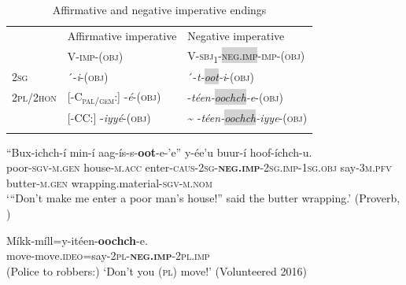 \documentclass[output=paper,colorlinks,citecolor=brown,draftmode
]{langscibook}
\begin{document}
\begin{table}
\caption{Affirmative and negative imperative endings}
\label{tab:treis:4}
 \begin{tabularx}{\textwidth}{lXl}
  \lsptoprule
& Affirmative imperative & Negative imperative \\
& V-\textsc{imp}-(\textsc{obj}) & V-\textsc{sbj\textsubscript{1}}-\textsc{\colorbox{lightgray}{neg.imp}}-\textsc{imp}-(\textsc{obj})\\ 
    \midrule 
\textsc{2sg} & ´-\textit{i}-(\textsc{obj}) & ´-\textit{t-\colorbox{lightgray}{oot}-i}-(\textsc{obj})\\
\textsc{2pl/2hon} & [-C\textsubscript{\textsc{pal/gem}}:] -\textit{é}-(\textsc{obj}) &  -\textit{téen-\colorbox{lightgray}{oochch}-e}-(\textsc{obj})\\
& [-CC:] -\textit{iyyé}-(\textsc{obj}) & \~{} -\textit{téen-\colorbox{lightgray}{oochch}-iyye}-(\textsc{obj})\\
  \lspbottomrule
 \end{tabularx}
\end{table}


\ea\label{ex:treis:5} 
\gll “Bux-ichch-í 	   min-í 				  aag-ís-s-\textbf{oot}-e-’e” y-ée’u 			buur-í 			hoof-íchch-u.\\
{\db}poor-\textsc{sgv-m.gen}	house-\textsc{m.acc}	enter-\textsc{caus-2sg-\textbf{neg.imp}-2sg.imp-1sg.obj} say-\textsc{3m.pfv}	butter-\textsc{m.gen}	wrapping.material-\textsc{sgv-m.nom} \\
\glt ‘“Don’t make me enter a poor man’s house!” said the butter wrapping.’ (Proverb, \citealt[33]{AlamuAlamaayyo2017}\footnotemark{})
\z 
{}

\ea\label{ex:treis:6}
\gll Míkk-míll=y-itéen-\textbf{oochch}-e.\\
move-move.\textsc{ideo}=say-\textsc{2pl-\textbf{neg.imp}-2pl.imp}\\
\glt (Police to robbers:) ‘Don’t you (\textsc{pl}) move!’  (Volunteered\footnotemark{} 2016)
\z 
{}
\end{document}
